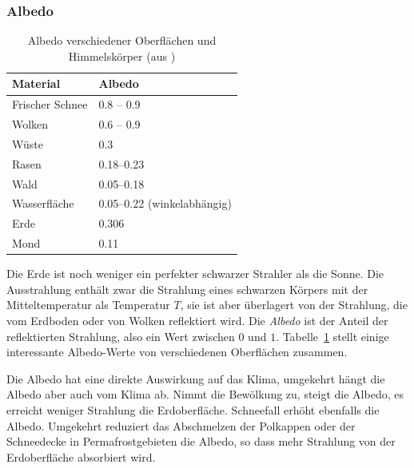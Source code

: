 \subsubsection{Albedo\label{skript:subsubsection:albedo}}
\begin{table}
\centering
\begin{tabular}{|l|l|}
\hline
Material&Albedo\\
\hline
Frischer Schnee&0.8 -- 0.9\\
Wolken         &0.6 -- 0.9\\
Wüste          &0.3\\
Rasen          &0.18--0.23\\
Wald           &0.05--0.18\\
Wasserfläche   &0.05--0.22 (winkelabhängig)\\
Erde           &0.306 \\
Mond           &0.11 \\
\hline
\end{tabular}
\caption{Albedo verschiedener Oberflächen und Himmelskörper
(aus \cite{skript:albedo})
\label{skript:albedotabelle}}
\end{table}
Die Erde ist noch weniger ein perfekter schwarzer Strahler als die Sonne.
Die Ausstrahlung enthält zwar die Strahlung eines schwarzen Körpers mit
der Mitteltemperatur als Temperatur $T$,
sie ist aber überlagert von der Strahlung, die vom Erdboden oder von
Wolken reflektiert wird.
Die {\em Albedo} ist der Anteil der reflektierten Strahlung, also ein
Wert zwischen $0$ und $1$.
Tabelle~\ref{skript:albedotabelle} stellt einige interessante
Albedo-Werte von verschiedenen Oberflächen zusammen.

Die Albedo hat eine direkte Auswirkung auf das Klima, umgekehrt
hängt die Albedo aber auch vom Klima ab.
Nimmt die Bewölkung zu, steigt die Albedo, es erreicht weniger 
Strahlung die Erdoberfläche.
Schneefall erhöht ebenfalls die Albedo.
Umgekehrt reduziert das Abschmelzen der Polkappen oder der
Schneedecke in Permafrostgebieten die Albedo, so dass mehr Strahlung
von der Erdoberfläche absorbiert wird.


